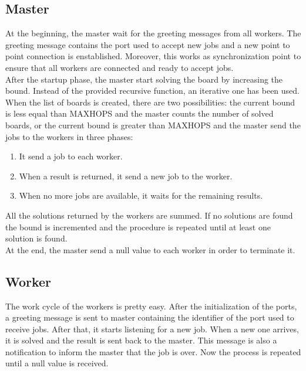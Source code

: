 \documentclass{article}
\begin{document}
\subsection{Master} \label{sec:master}
At the beginning, the master wait for the greeting messages from all workers. The greeting message contains the port used to accept new jobs and a new point to point connection is enstablished. Moreover, this works as synchronization point to ensure that all workers are connected and ready to accept jobs. \\
After the startup phase, the master start solving the board by increasing the bound. Instead of the provided recursive function, an iterative one has been used. When the list of boards is created, there are two possibilities: the current bound is less equal than MAXHOPS and the master counts the number of solved boards, or the current bound is greater than MAXHOPS and the master send the jobs to the workers in three phases:
\begin{enumerate}
    \item It send a job to each worker.
    \item When a result is returned, it send a new job to the worker.
    \item When no more jobs are available, it waits for the remaining results.
\end{enumerate}
All the solutions returned by the workers are summed. If no solutions are found the bound is incremented and the procedure is repeated until at least one solution is found. \\
At the end, the master send a null value to each worker in order to terminate it.


\subsection{Worker}
The work cycle of the workers is pretty easy. After the initialization of the ports, a greeting message is sent to master containing the identifier of the port used to receive jobs. After that, it starts listening for a new job. When a new one arrives, it is solved and the result is sent back to the master. This message is also a notification to inform the master that the job is over. Now the process is repeated until a null value is received.
\end{document}
